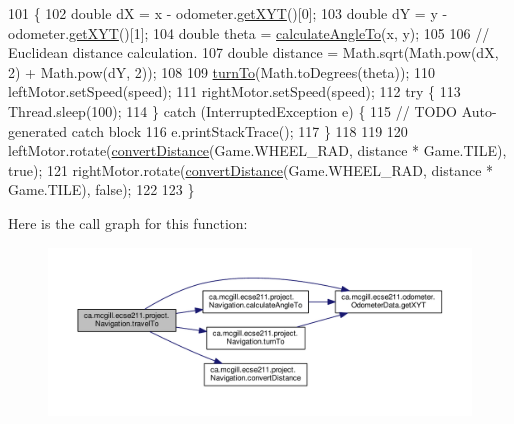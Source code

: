 \begin{DoxyCode}
101                                                       \{
102     \textcolor{keywordtype}{double} dX = x - odometer.\hyperlink{classca_1_1mcgill_1_1ecse211_1_1odometer_1_1_odometer_data_a8f40f0264c68f0cbed4fff1723ae7863}{getXYT}()[0];
103     \textcolor{keywordtype}{double} dY = y - odometer.\hyperlink{classca_1_1mcgill_1_1ecse211_1_1odometer_1_1_odometer_data_a8f40f0264c68f0cbed4fff1723ae7863}{getXYT}()[1];
104     \textcolor{keywordtype}{double} theta = \hyperlink{classca_1_1mcgill_1_1ecse211_1_1project_1_1_navigation_a4376e54162df8f123ca3b52e4fd2f38d}{calculateAngleTo}(x, y);
105 
106     \textcolor{comment}{// Euclidean distance calculation.}
107     \textcolor{keywordtype}{double} distance = Math.sqrt(Math.pow(dX, 2) + Math.pow(dY, 2));
108 
109     \hyperlink{classca_1_1mcgill_1_1ecse211_1_1project_1_1_navigation_a3bbe0645f2b3b3d0986b4a707fb5a00c}{turnTo}(Math.toDegrees(theta));
110     leftMotor.setSpeed(speed);
111     rightMotor.setSpeed(speed);
112     \textcolor{keywordflow}{try} \{
113       Thread.sleep(100);
114     \} \textcolor{keywordflow}{catch} (InterruptedException e) \{
115       \textcolor{comment}{// TODO Auto-generated catch block}
116       e.printStackTrace();
117     \}
118    
119 
120     leftMotor.rotate(\hyperlink{classca_1_1mcgill_1_1ecse211_1_1project_1_1_navigation_ac9e260bcd619ffa4820d7d0de7ea1c12}{convertDistance}(Game.WHEEL\_RAD, distance * Game.TILE), \textcolor{keyword}{true});
121     rightMotor.rotate(\hyperlink{classca_1_1mcgill_1_1ecse211_1_1project_1_1_navigation_ac9e260bcd619ffa4820d7d0de7ea1c12}{convertDistance}(Game.WHEEL\_RAD, distance * Game.TILE), \textcolor{keyword}{false});
122     
123   \}
\end{DoxyCode}
Here is the call graph for this function\+:
\nopagebreak
\begin{figure}[H]
\begin{center}
\leavevmode
\includegraphics[width=350pt]{classca_1_1mcgill_1_1ecse211_1_1project_1_1_navigation_a3d8354490a2d8c36090d794c25d33421_cgraph}
\end{center}
\end{figure}

